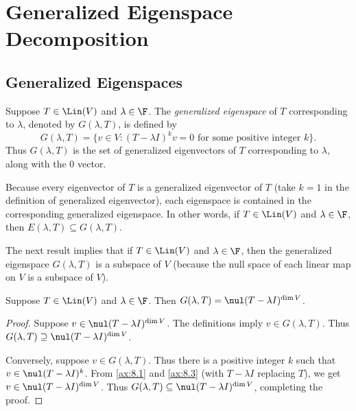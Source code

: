 \DeclareRobustCommand\axeqnum[1]{\refstepcounter{theorem}\label{ax:#1}}
\section{Generalized Eigenspace Decomposition}

\subsection{Generalized Eigenspaces}

\begin{definition}\label{ax:8.19}
Suppose $T\in\Lin(V)$ and $\lambda\in\F$. The \emph{generalized eigenspace} of
$T$ corresponding to $\lambda$, denoted by $G(\lambda,T)$, is defined by
\[ G(\lambda,T) = \{v\in V : (T-\lambda I)^kv=0 \text{ for some positive
   integer } k\}. \]
Thus $G(\lambda,T)$ is the set of generalized eigenvectors of $T$ corresponding
to $\lambda$, along with the $0$ vector.
\end{definition}

Because every eigenvector of $T$ is a generalized eigenvector of $T$ (take
$k=1$ in the definition of generalized eigenvector), each eigenspace is
contained in the corresponding generalized eigenspace. In other words, if
$T\in\Lin(V)$ and $\lambda\in\F$, then $E(\lambda,T)\subseteq G(\lambda,T)$.

The next result implies that if $T\in\Lin(V)$ and $\lambda\in\F$, then the
generalized eigen\-space $G(\lambda,T)$ is a subspace of $V$ (because the null
space of each linear map on $V$ is a subspace of $V$).

\begin{result}\label{ax:8.20}
Suppose $T\in\Lin(V)$ and $\lambda\in\F$. Then
$G(\lambda,T)=\nul(T-\lambda I)^{\dim V}$.
\end{result}

\begin{proof}
Suppose $v\in\nul(T-\lambda I)^{\dim V}$. The definitions imply
$v\in G(\lambda,T)$. Thus $G(\lambda,T)\supseteq\nul(T-\lambda I)^{\dim V}$.

Conversely, suppose $v\in G(\lambda,T)$. Thus there is a positive integer $k$
such that $v\in\nul(T-\lambda I)^k$. From \ref{ax:8.1} and \ref{ax:8.3} (with
$T-\lambda I$ replacing $T$), we get $v\in\nul(T-\lambda I)^{\dim V}$. Thus
$G(\lambda,T)\subseteq\nul(T-\lambda I)^{\dim V}$, completing the proof.
\end{proof}

